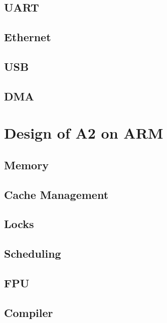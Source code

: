 \documentclass[a4paper]{article}
\begin{document}
\subsection{UART}
\subsection{Ethernet}
\subsection{USB}
\subsection{DMA}

\section{Design of A2 on ARM}
\subsection{Memory}
\subsection{Cache Management}
\subsection{Locks}
\subsection{Scheduling}
\subsection{FPU}
\subsection{Compiler}
\end{document}
